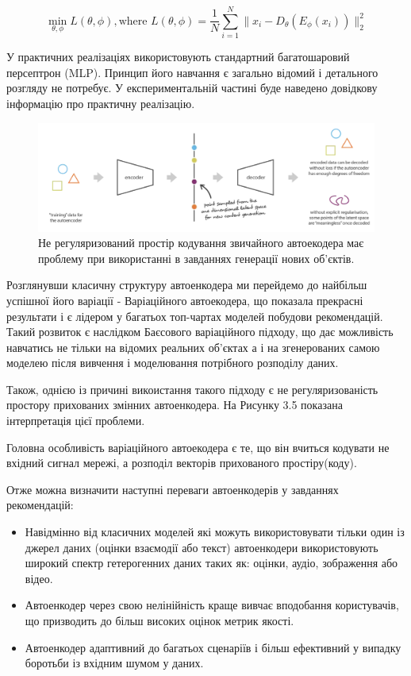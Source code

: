 \[ \min _{\theta ,\phi }L(\theta ,\phi ),{\text{where }}L(\theta ,\phi )={\frac {1}{N}}\sum _{i=1}^{N}\|x_{i}-D_{\theta }(E_{\phi }(x_{i}))\|_{2}^{2}\]

У практичних реалізаціях використовують стандартний багатошаровий персептрон (MLP). Принцип його навчання є загально відомий і детального розгляду не потребує. У експериментальній частині буде наведено довідкову інформацію про практичну реалізацію.
\begin{figure}
    \centering
    \includegraphics[width=1\textwidth]{images/AE_reg_problem.png}
    \caption{Не регуляризований простір кодування звичайного автоекодера має проблему при використанні в завданнях генерації нових об’єктів.}
\end{figure}
Розглянувши класичну структуру автоенкодера ми перейдемо до найбільш успішної його варіації - Варіаційного автоекодера, що показала прекрасні результати і є лідером у багатьох топ-чартах моделей побудови рекомендацій. Такий розвиток є наслідком Баєсового варіаційного підходу, що дає можливість навчатись не тільки на відомих реальних об’єктах а і на згенерованих самою моделею після вивчення і моделювання потрібного розподілу даних.

Також, однією із причині викоистання такого підходу є не регуляризованість простору прихованих змінних автоенкодера. На Рисунку 3.5 показана інтерпретація цієї проблеми.

Головна особливість варіаційного автоекодера є те, що він вчиться кодувати не вхідний сигнал мережі, а розподіл векторів прихованого простіру(коду).

Отже можна визначити наступні переваги автоенкодерів у завданнях рекомендацій:
\begin{itemize}
    \item Навідмінно від класичних моделей які можуть використовувати тільки один із джерел даних (оцінки взаємодії або текст) автоенкодери використовують широкий спектр гетерогенних даних таких як: оцінки, аудіо, зображення або відео.
    \item Автоенкодер через свою нелінійність краще вивчає вподобання користувачів, що призводить до більш високих оцінок метрик якості.
    \item Автоенкодер адаптивний до багатьох сценаріїв і більш ефективний у випадку боротьби із вхідним шумом у даних.
\end{itemize}
